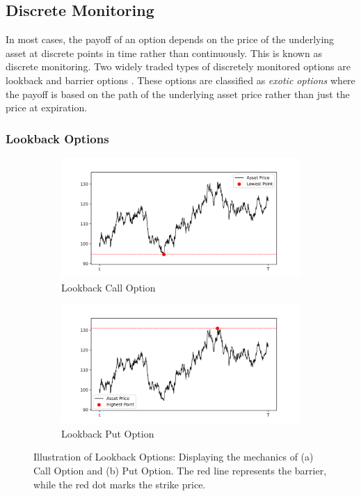 \documentclass[a4paper]{report}
\begin{document}
\subsection{Discrete Monitoring}\label{section:discrete_monitoring}
In most cases, the payoff of an option depends on the price of the underlying asset at discrete points in time rather than continuously. This is known as discrete monitoring. Two widely traded types of discretely monitored options are lookback and barrier options \citep{dadachanji2015fx}. These options are classified as \textit{exotic options} where the payoff is based on the path of the underlying asset price rather than just the price at expiration.

\subsubsection{Lookback Options}
\begin{figure}[H]
    \begin{subfigure}{.5\linewidth}
      \includegraphics[width=\linewidth]{images/call_option.png}
      \caption{Lookback Call Option}
      \label{fig:call_option}
    \end{subfigure}\hfill
    \begin{subfigure}{.5\linewidth}
      \includegraphics[width=\linewidth]{images/put_option.png}
      \caption{Lookback Put Option}
      \label{fig:put_option}
    \end{subfigure}
    \caption{Illustration of Lookback Options: Displaying the mechanics of (a) Call Option and (b) Put Option. The red line represents the barrier, while the red dot marks the strike price.}
\end{figure}
\end{document}
